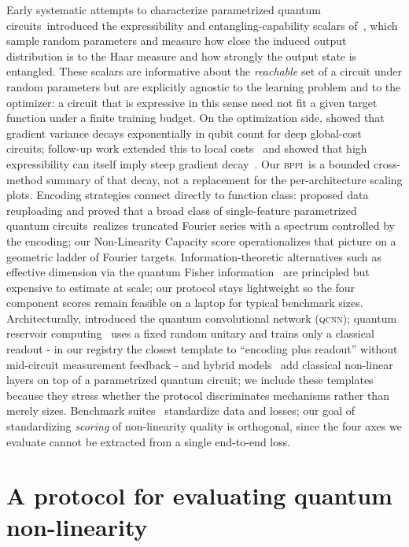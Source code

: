 \documentclass{article}
\newcommand{\bppi}{\textsc{bppi}}
\newcommand{\pqc}{parametrized quantum circuit}
\newcommand{\pqcs}{parametrized quantum circuits}
\begin{document}
Early systematic attempts to characterize \pqcs\ introduced the expressibility and entangling-capability scalars of~\citet{sim2019expressibility}, which sample random parameters and measure how close the induced output distribution is to the Haar measure and how strongly the output state is entangled.
These scalars are informative about the \emph{reachable} set of a circuit under random parameters but are explicitly agnostic to the learning problem and to the optimizer: a circuit that is expressive in this sense need not fit a given target function under a finite training budget.
On the optimization side, \citet{mcclean2018barren} showed that gradient variance decays exponentially in qubit count for deep global-cost circuits; follow-up work extended this to local costs~\citep{cerezo2021cost} and showed that high expressibility can itself imply steep gradient decay~\citep{holmes2022connecting,ragone2024unified}.
Our \bppi\ is a bounded cross-method summary of that decay, not a replacement for the per-architecture scaling plots.
Encoding strategies connect directly to function class: \citet{perez2020data} proposed data reuploading and \citet{schuld2021effect} proved that a broad class of single-feature \pqcs\ realizes truncated Fourier series with a spectrum controlled by the encoding; our Non-Linearity Capacity score operationalizes that picture on a geometric ladder of Fourier targets.
Information-theoretic alternatives such as effective dimension via the quantum Fisher information~\citep{abbas2021power} are principled but expensive to estimate at scale; our protocol stays lightweight so the four component scores remain feasible on a laptop for typical benchmark sizes.
Architecturally, \citet{cong2019qcnn} introduced the quantum convolutional network (\textsc{qcnn}); quantum reservoir computing~\citep{fujii2017harnessing,nakajima2019boosting} uses a fixed random unitary and trains only a classical readout - in our registry the closest template to ``encoding plus readout'' without mid-circuit measurement feedback - and hybrid models~\citep{mari2020transfer} add classical non-linear layers on top of a \pqc; we include these templates because they stress whether the protocol discriminates mechanisms rather than merely sizes.
Benchmark suites~\citep{perrier2022qdataset,bowles2024better} standardize data and losses; our goal of standardizing \emph{scoring} of non-linearity quality is orthogonal, since the four axes we evaluate cannot be extracted from a single end-to-end loss.

\section{A protocol for evaluating quantum non-linearity}
\label{sec:protocol}
\end{document}
